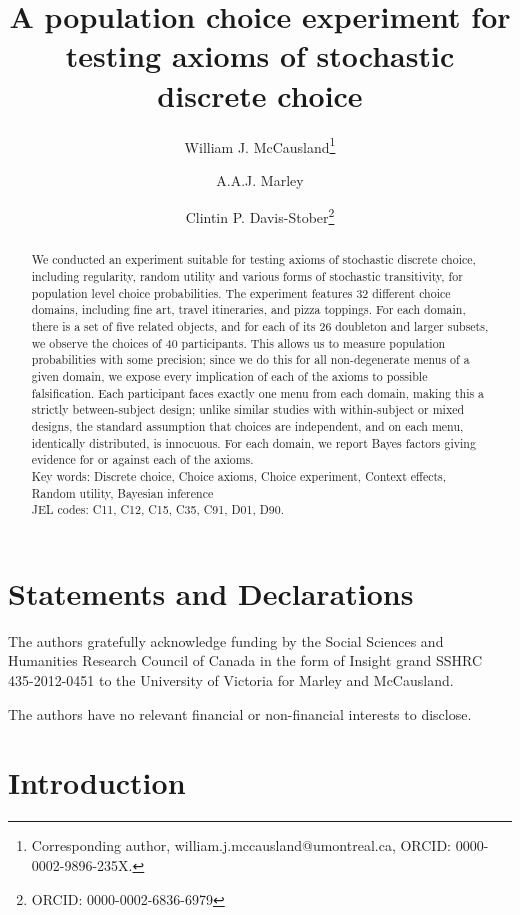 \documentclass[11pt,letter]{article}
\title{A population choice experiment for testing axioms of stochastic discrete choice}{}
\author[1]{William J. McCausland\thanks{Corresponding author, william.j.mccausland@umontreal.ca, ORCID: 0000-0002-9896-235X.}}
\author[2]{A.A.J. Marley}
\author[3]{Clintin P. Davis-Stober\thanks{ORCID: 0000-0002-6836-6979}}
\affil[1]{D\'epartement de sciences \'economiques and CIREQ, Universit\'e de Montr\'eal}
\affil[2]{Department of Psychology, University of Victoria}
\affil[3]{Department of Psychological Sciences; MU Institute for Data Science and Informatics, University of Missouri}
\newcommand{\menu}{menu}
\newcommand{\menus}{menus}
\begin{document}
\maketitle

\begin{abstract}
	We conducted an experiment suitable for testing axioms of stochastic discrete choice, including regularity, random utility and various forms of stochastic transitivity, for population level choice probabilities.
	The experiment features 32 different choice domains, including fine art, travel itineraries, and pizza toppings.
	For each domain, there is a set of five related objects, and for each of its 26 doubleton and larger subsets, we observe the choices of 40 participants.
	This allows us to measure population probabilities with some precision; since we do this for all non-degenerate \menus{} of a given domain, we expose every implication of each of the axioms to possible falsification.
	Each participant faces exactly one \menu{} from each domain, making this a strictly between-subject design; unlike similar studies with within-subject or mixed designs, the standard assumption that choices are independent, and on each \menu{}, identically distributed, is innocuous.
	For each domain, we report Bayes factors giving evidence for or against each of the axioms.\\
	Key words: Discrete choice, Choice axioms, Choice experiment, Context effects, Random utility, Bayesian inference \\
	JEL codes: C11, C12, C15, C35, C91, D01, D90.
\end{abstract}

\section*{Statements and Declarations}

The authors gratefully acknowledge funding by the Social Sciences and Humanities Research Council of Canada in the form of Insight grand SSHRC 435-2012-0451 to the University of Victoria for Marley and McCausland.

The authors have no relevant financial or non-financial interests to disclose.

\section{Introduction}
\end{document}
